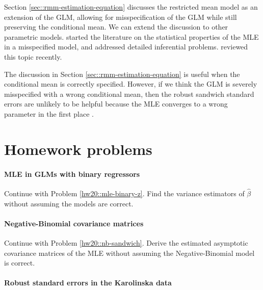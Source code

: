 Section \ref{sec::rmm-estimation-equation} discusses the restricted mean model as an extension of the GLM, allowing for misspecification of the GLM while still preserving the conditional mean. We can extend the discussion to other parametric models. 
\citet{huber::1967} started the literature on the statistical properties of the MLE in a misspecified model, and
\citet{white1982maximum} addressed detailed inferential problems. 
\citet{buja2019models2} reviewed this topic recently. 



The discussion in Section \ref{sec::rmm-estimation-equation} is useful when the conditional mean is correctly specified. However, if we think the GLM is severely misspecified with a wrong conditional mean, then the robust sandwich standard errors are unlikely to be helpful because the MLE converges to a wrong parameter in the first place \citep{freedman2006so}.  

 




\section{Homework problems}

 

\paragraph{MLE in GLMs with binary regressors}\label{hw20::mle-binary-z-misspecified}


Continue with Problem \ref{hw20::mle-binary-z}. Find the variance estimators of $\hat\beta$ without assuming the models are correct. 





 
\paragraph{Negative-Binomial covariance matrices}\label{hw20::nb-sandwich-misspecified}


Continue with Problem \ref{hw20::nb-sandwich}. Derive the estimated asymptotic covariance matrices of the MLE without assuming the Negative-Binomial model is correct. 

 


\paragraph{Robust standard errors in the Karolinska data}\label{hw20::robust-se-karolinska}

